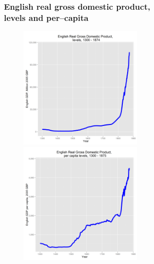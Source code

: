 \documentclass[final]{beamer}
\begin{document}
\begin{frame}
\frametitle{English real gross domestic product, \\
levels and per--capita }

		\begin{figure}[p!]
		\label{fig:ggdp}		
		\centerline{
		\mbox{\includegraphics[width=0.55\textwidth]{ggdp}}
		\mbox{\includegraphics[width=0.55\textwidth]{ggdppop}}
		}
		\end{figure}
\end{frame}
\end{document}
